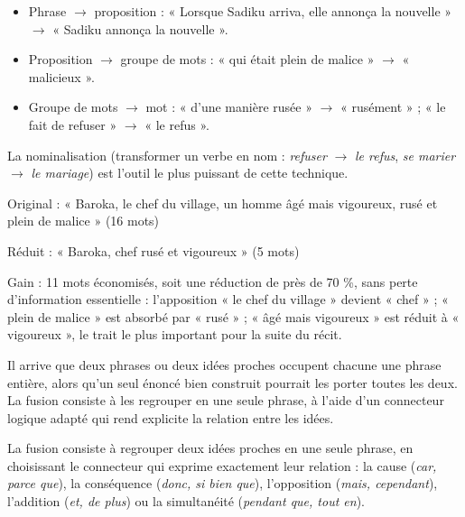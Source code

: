 \documentclass[11pt]{article}
\newcommand{\cle}[1]{{\popxbold\color{popdark}#1}}
\newcounter{popsec}
\newcounter{popsub}
\newcommand{\courssub}[1]{%
  \stepcounter{popsub}%
  \par\vspace{9pt}\noindent{\popxbold\fontsize{11.5}{13}\selectfont\color{popink}{\color{poporange}\thepopsec.\thepopsub}\hspace{6pt}#1}\par\nopagebreak\vspace{4pt}
}
\begin{document}
\begin{exemplebox}
\begin{itemize}
\item Phrase $\rightarrow$ proposition : « Lorsque Sadiku arriva, elle annonça la nouvelle » $\rightarrow$ « Sadiku annonça la nouvelle ».
\item Proposition $\rightarrow$ groupe de mots : « qui était plein de malice » $\rightarrow$ « malicieux ».
\item Groupe de mots $\rightarrow$ mot : « d'une manière rusée » $\rightarrow$ « rusément » ; « le fait de refuser » $\rightarrow$ « le refus ».
\end{itemize}
La nominalisation (transformer un verbe en nom : \emph{refuser} $\rightarrow$ \emph{le refus}, \emph{se marier} $\rightarrow$ \emph{le mariage}) est l'outil le plus puissant de cette technique.
\end{exemplebox}

\begin{exemplebox}
Original : « Baroka, le chef du village, un homme âgé mais vigoureux, rusé et plein de malice » (16 mots)

Réduit : « Baroka, chef rusé et vigoureux » (5 mots)

Gain : 11 mots économisés, soit une réduction de près de 70 \%, sans perte d'information essentielle : l'apposition « le chef du village » devient « chef » ; « plein de malice » est absorbé par « rusé » ; « âgé mais vigoureux » est réduit à « vigoureux », le trait le plus important pour la suite du récit.
\end{exemplebox}

\courssub{Technique 4 : la fusion}

Il arrive que deux phrases ou deux idées proches occupent chacune une phrase entière, alors qu'un seul énoncé bien construit pourrait les porter toutes les deux. La \cle{fusion} consiste à les regrouper en une seule phrase, à l'aide d'un \cle{connecteur logique} adapté qui rend explicite la relation entre les idées.

\begin{definition}[La fusion]
La fusion consiste à regrouper deux idées proches en une seule phrase, en choisissant le connecteur qui exprime exactement leur relation : la cause (\emph{car, parce que}), la conséquence (\emph{donc, si bien que}), l'opposition (\emph{mais, cependant}), l'addition (\emph{et, de plus}) ou la simultanéité (\emph{pendant que, tout en}).
\end{definition}
\end{document}
